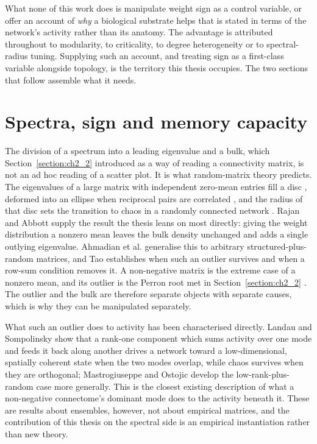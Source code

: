 What none of this work does is manipulate weight sign as a control variable, or offer an
account of \emph{why} a biological substrate helps that is stated in terms of the network's
activity rather than its anatomy. The advantage is attributed throughout to modularity, to
criticality, to degree heterogeneity or to spectral-radius tuning. Supplying such an
account, and treating sign as a first-class variable alongside topology, is the territory
this thesis occupies. The two sections that follow assemble what it needs.
 
 
 
 
\section{Spectra, sign and memory capacity}
\label{section:spectra-capacity}
\bigskip
 
The division of a spectrum into a leading eigenvalue and a bulk, which
Section~\ref{section:ch2_2} introduced as a way of reading a connectivity matrix, is not an
ad hoc reading of a scatter plot. It is what random-matrix theory predicts. The eigenvalues
of a large matrix with independent zero-mean entries fill a disc \cite{girko1985circular},
deformed into an ellipse when reciprocal pairs are correlated \cite{sommers1988spectrum},
and the radius of that disc sets the transition to chaos in a randomly connected network
\cite{sompolinsky1988chaos, kadmon2015transition}. Rajan and Abbott
\cite{rajan2006eigenvalue} supply the result the thesis leans on most directly: giving the
weight distribution a nonzero mean leaves the bulk density unchanged and adds a single
outlying eigenvalue. Ahmadian et al. \cite{ahmadian2015properties} generalise this to
arbitrary structured-plus-random matrices, and Tao \cite{tao2013outliers} establishes when
such an outlier survives and when a row-sum condition removes it. A non-negative matrix is
the extreme case of a nonzero mean, and its outlier is the Perron root met in
Section~\ref{section:ch2_2} \cite{horn2012matrix}. The outlier and the bulk are therefore
separate objects with separate causes, which is why they can be manipulated separately.
 
What such an outlier does to activity has been characterised directly. Landau and
Sompolinsky \cite{landau2018coherent} show that a rank-one component which sums activity
over one mode and feeds it back along another drives a network toward a low-dimensional,
spatially coherent state when the two modes overlap, while chaos survives when they are
orthogonal; Mastrogiuseppe and Ostojic \cite{mastrogiuseppe2018linking} develop the
low-rank-plus-random case more generally. This is the closest existing description of what
a non-negative connectome's dominant mode does to the activity beneath it. These are
results about ensembles, however, not about empirical matrices, and the contribution of
this thesis on the spectral side is an empirical instantiation rather than new theory.
 
